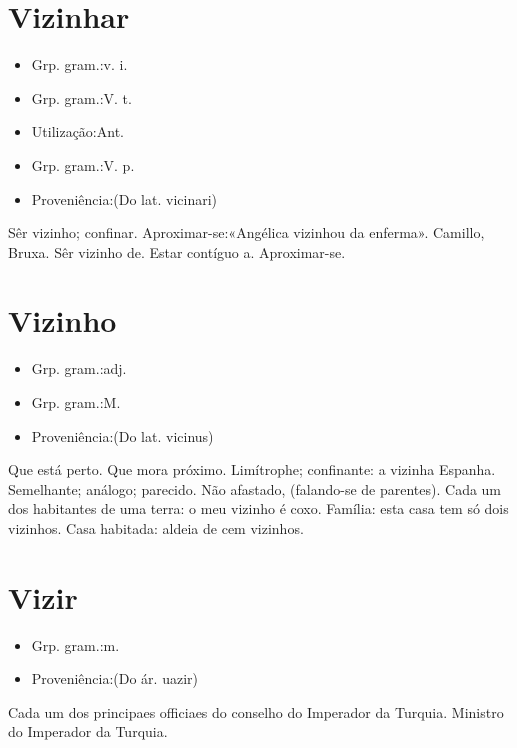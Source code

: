 \documentclass{article}
\begin{document}
\section{Vizinhar}
\begin{itemize}
\item {Grp. gram.:v. i.}
\end{itemize}
\begin{itemize}
\item {Grp. gram.:V. t.}
\end{itemize}
\begin{itemize}
\item {Utilização:Ant.}
\end{itemize}
\begin{itemize}
\item {Grp. gram.:V. p.}
\end{itemize}
\begin{itemize}
\item {Proveniência:(Do lat. \textunderscore vicinari\textunderscore )}
\end{itemize}
Sêr vizinho; confinar.
Aproximar-se:«\textunderscore Angélica vizinhou da enferma\textunderscore ». Camillo, \textunderscore Bruxa\textunderscore .
Sêr vizinho de.
Estar contíguo a.
Aproximar-se.
\section{Vizinho}
\begin{itemize}
\item {Grp. gram.:adj.}
\end{itemize}
\begin{itemize}
\item {Grp. gram.:M.}
\end{itemize}
\begin{itemize}
\item {Proveniência:(Do lat. \textunderscore vicinus\textunderscore )}
\end{itemize}
Que está perto.
Que mora próximo.
Limítrophe; confinante: \textunderscore a vizinha Espanha\textunderscore .
Semelhante; análogo; parecido.
Não afastado, (falando-se de parentes).
Cada um dos habitantes de uma terra: \textunderscore o meu vizinho é coxo\textunderscore .
Família: \textunderscore esta casa tem só dois vizinhos\textunderscore .
Casa habitada: \textunderscore aldeia de cem vizinhos\textunderscore .
\section{Vizir}
\begin{itemize}
\item {Grp. gram.:m.}
\end{itemize}
\begin{itemize}
\item {Proveniência:(Do ár. \textunderscore uazir\textunderscore )}
\end{itemize}
Cada um dos principaes officiaes do conselho do Imperador da Turquia.
Ministro do Imperador da Turquia.
\end{document}
